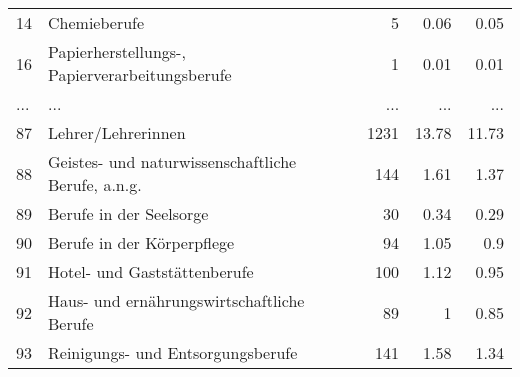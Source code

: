 \begin{longtable}{lXrrr}
        14 & \multicolumn{1}{X}{Chemieberufe} & %
          \num{5} &
          \num[round-mode=places,round-precision=2]{0,06} &
          \num[round-mode=places,round-precision=2]{0,05} \\
        16 & \multicolumn{1}{X}{Papierherstellungs-, Papierverarbeitungsberufe} & %
          \num{1} &
          \num[round-mode=places,round-precision=2]{0,01} &
          \num[round-mode=places,round-precision=2]{0,01} \\
       ... & ... & ... & ... & ... \\
        87 & \multicolumn{1}{X}{Lehrer/Lehrerinnen} & %
          \num{1231} &
          \num[round-mode=places,round-precision=2]{13,78} &
          \num[round-mode=places,round-precision=2]{11,73} \\

        88 & \multicolumn{1}{X}{Geistes- und naturwissenschaftliche Berufe, a.n.g.} & %
          \num{144} &
          \num[round-mode=places,round-precision=2]{1,61} &
          \num[round-mode=places,round-precision=2]{1,37} \\

        89 & \multicolumn{1}{X}{Berufe in der Seelsorge} & %
          \num{30} &
          \num[round-mode=places,round-precision=2]{0,34} &
          \num[round-mode=places,round-precision=2]{0,29} \\

        90 & \multicolumn{1}{X}{Berufe in der Körperpflege} & %
          \num{94} &
          \num[round-mode=places,round-precision=2]{1,05} &
          \num[round-mode=places,round-precision=2]{0,9} \\

        91 & \multicolumn{1}{X}{Hotel- und Gaststättenberufe} & %
          \num{100} &
          \num[round-mode=places,round-precision=2]{1,12} &
          \num[round-mode=places,round-precision=2]{0,95} \\

        92 & \multicolumn{1}{X}{Haus- und ernährungswirtschaftliche Berufe} & %
          \num{89} &
          \num[round-mode=places,round-precision=2]{1} &
          \num[round-mode=places,round-precision=2]{0,85} \\

        93 & \multicolumn{1}{X}{Reinigungs- und Entsorgungsberufe} & %
          \num{141} &
          \num[round-mode=places,round-precision=2]{1,58} &
          \num[round-mode=places,round-precision=2]{1,34} \\


\end{longtable}
